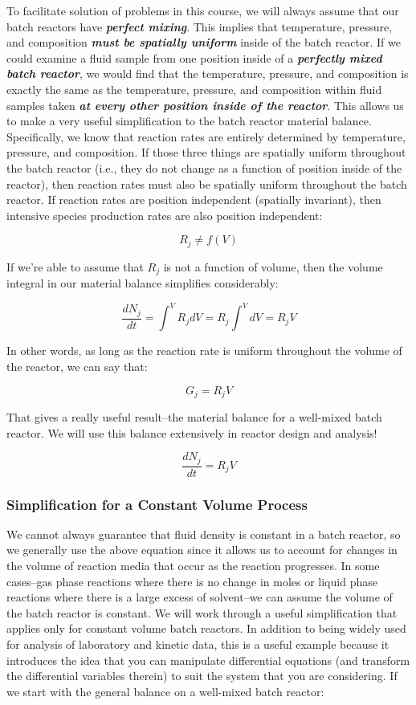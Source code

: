 \documentclass[11pt]{article}
\begin{document}
To facilitate solution of problems in this course, we will always assume
that our batch reactors have \textbf{\emph{perfect mixing}}. This
implies that temperature, pressure, and composition \textbf{\emph{must
be spatially uniform}} inside of the batch reactor. If we could examine
a fluid sample from one position inside of a \textbf{\emph{perfectly
mixed batch reactor}}, we would find that the temperature, pressure, and
composition is exactly the same as the temperature, pressure, and
composition within fluid samples taken \textbf{\emph{at every other
position inside of the reactor}}. This allows us to make a very useful
simplification to the batch reactor material balance. Specifically, we
know that reaction rates are entirely determined by temperature,
pressure, and composition. If those three things are spatially uniform
throughout the batch reactor (i.e., they do not change as a function of
position inside of the reactor), then reaction rates must also be
spatially uniform throughout the batch reactor. If reaction rates are
position independent (spatially invariant), then intensive species
production rates are also position independent:

\[R_j \neq f(V)\]

If we're able to assume that \(R_j\) is not a function of volume, then
the volume integral in our material balance simplifies considerably:

\[\frac{dN_j}{dt} = \int^V R_jdV = R_j \int^V dV = R_j V \]

In other words, as long as the reaction rate is uniform throughout the
volume of the reactor, we can say that:

\[G_j = R_j V\]

That gives a really useful result--the material balance for a well-mixed
batch reactor. We will use this balance extensively in reactor design
and analysis!

\[\frac{dN_j}{dt} = R_j V \]

    \hypertarget{simplification-for-a-constant-volume-process}{%
\subsubsection{Simplification for a Constant Volume
Process}\label{simplification-for-a-constant-volume-process}}

We cannot always guarantee that fluid density is constant in a batch
reactor, so we generally use the above equation since it allows us to
account for changes in the volume of reaction media that occur as the
reaction progresses. In some cases--gas phase reactions where there is
no change in moles or liquid phase reactions where there is a large
excess of solvent--we can assume the volume of the batch reactor is
constant. We will work through a useful simplification that applies only
for constant volume batch reactors. In addition to being widely used for
analysis of laboratory and kinetic data, this is a useful example
because it introduces the idea that you can manipulate differential
equations (and transform the differential variables therein) to suit the
system that you are considering. If we start with the general balance on
a well-mixed batch reactor:
\end{document}
